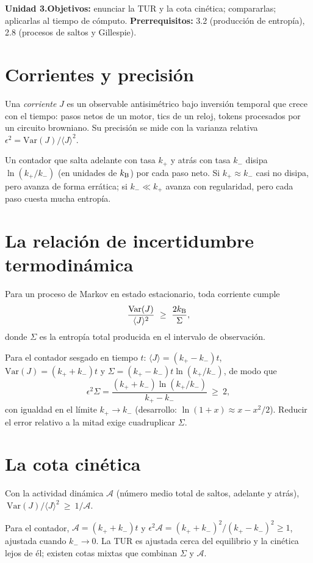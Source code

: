 \documentclass[11pt,a4paper]{article}
\begin{document}

\noindent\textbf{Unidad 3.}\quad\textbf{Objetivos:} enunciar la TUR y la cota cinética; compararlas; aplicarlas al tiempo de cómputo.
\textbf{Prerrequisitos:} 3.2 (producción de entropía), 2.8 (procesos de saltos y Gillespie).

\section{Corrientes y precisión}
Una \emph{corriente} $J$ es un observable antisimétrico bajo inversión temporal que crece con el tiempo: pasos netos de un motor, tics de
un reloj, tokens procesados por un circuito browniano. Su precisión se mide con la varianza relativa
$\epsilon^2 = \mathrm{Var}(J)/\langle J\rangle^2$.

\begin{intuicion}
Un contador que salta adelante con tasa $k_+$ y atrás con tasa $k_-$ disipa $\ln(k_+/k_-)$ (en unidades de $k_{\mathrm B}$) por cada paso neto.
Si $k_+\approx k_-$ casi no disipa, pero avanza de forma errática; si $k_-\ll k_+$ avanza con regularidad, pero cada paso cuesta mucha entropía.
\end{intuicion}

\section{La relación de incertidumbre termodinámica}
\begin{resultado}[ (TUR)]
Para un proceso de Markov en estado estacionario, toda corriente cumple
\begin{equation}
\frac{\mathrm{Var}(J)}{\langle J\rangle^2}\ \ge\ \frac{2k_{\mathrm B}}{\Sigma},
\end{equation}
donde $\Sigma$ es la entropía total producida en el intervalo de observación.
\end{resultado}
\noindent Para el contador sesgado en tiempo $t$: $\langle J\rangle=(k_+-k_-)t$, $\mathrm{Var}(J)=(k_++k_-)t$ y $\Sigma=(k_+-k_-)t\ln(k_+/k_-)$, de modo que
\begin{equation}
\epsilon^2\Sigma=\frac{(k_++k_-)\ln(k_+/k_-)}{k_+-k_-}\ \ge\ 2,
\end{equation}
con igualdad en el límite $k_+\to k_-$ (desarrollo: $\ln(1+x)\approx x-x^2/2$). Reducir el error relativo a la mitad exige cuadruplicar $\Sigma$.

\section{La cota cinética}
\begin{resultado}
Con la actividad dinámica $\mathcal A$ (número medio total de saltos, adelante y atrás), $\ \mathrm{Var}(J)/\langle J\rangle^2\ \ge\ 1/\mathcal A$.
\end{resultado}
Para el contador, $\mathcal A=(k_++k_-)t$ y $\epsilon^2\mathcal A=(k_++k_-)^2/(k_+-k_-)^2\ge1$, ajustada cuando $k_-\to0$. La TUR es ajustada cerca
del equilibrio y la cinética lejos de él; existen cotas mixtas que combinan $\Sigma$ y $\mathcal A$.
\end{document}
